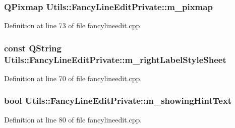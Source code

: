 \hypertarget{class_utils_1_1_fancy_line_edit_private_ad8bbe3f232d24f0176ef6754253b8d3a}{
\subsubsection[{m\-\_\-pixmap}]{\setlength{\rightskip}{0pt plus 5cm}Q\-Pixmap Utils\-::\-Fancy\-Line\-Edit\-Private\-::m\-\_\-pixmap}}\label{class_utils_1_1_fancy_line_edit_private_ad8bbe3f232d24f0176ef6754253b8d3a}


Definition at line 73 of file fancylineedit.\-cpp.

\hypertarget{class_utils_1_1_fancy_line_edit_private_a72ea68074cff6c0179e513bc1c92bcd3}{
\subsubsection[{m\-\_\-right\-Label\-Style\-Sheet}]{\setlength{\rightskip}{0pt plus 5cm}const {\bf Q\-String} Utils\-::\-Fancy\-Line\-Edit\-Private\-::m\-\_\-right\-Label\-Style\-Sheet}}\label{class_utils_1_1_fancy_line_edit_private_a72ea68074cff6c0179e513bc1c92bcd3}


Definition at line 70 of file fancylineedit.\-cpp.

\hypertarget{class_utils_1_1_fancy_line_edit_private_a283cbbdaa3d8a3b4a2a422e1000f76b0}{
\subsubsection[{m\-\_\-showing\-Hint\-Text}]{\setlength{\rightskip}{0pt plus 5cm}bool Utils\-::\-Fancy\-Line\-Edit\-Private\-::m\-\_\-showing\-Hint\-Text}}\label{class_utils_1_1_fancy_line_edit_private_a283cbbdaa3d8a3b4a2a422e1000f76b0}


Definition at line 80 of file fancylineedit.\-cpp.

